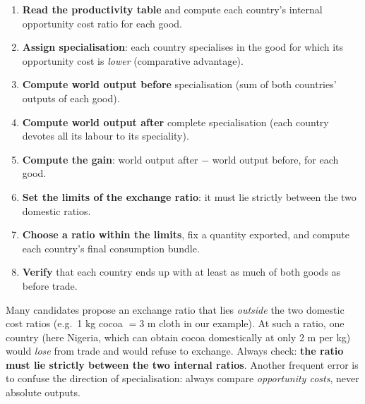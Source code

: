 \documentclass[11pt]{article}
\begin{document}
\begin{methode}
\begin{enumerate}
\item \textbf{Read the productivity table} and compute each country's internal opportunity cost ratio for each good.
\item \textbf{Assign specialisation}: each country specialises in the good for which its opportunity cost is \emph{lower} (comparative advantage).
\item \textbf{Compute world output before} specialisation (sum of both countries' outputs of each good).
\item \textbf{Compute world output after} complete specialisation (each country devotes all its labour to its speciality).
\item \textbf{Compute the gain}: world output after $-$ world output before, for each good.
\item \textbf{Set the limits of the exchange ratio}: it must lie strictly between the two domestic ratios.
\item \textbf{Choose a ratio within the limits}, fix a quantity exported, and compute each country's final consumption bundle.
\item \textbf{Verify} that each country ends up with at least as much of both goods as before trade.
\end{enumerate}
\end{methode}

\begin{attention}
Many candidates propose an exchange ratio that lies \emph{outside} the two domestic cost ratios (e.g.\ 1 kg cocoa $= 3$ m cloth in our example). At such a ratio, one country (here Nigeria, which can obtain cocoa domestically at only 2 m per kg) would \emph{lose} from trade and would refuse to exchange. Always check: \textbf{the ratio must lie strictly between the two internal ratios}. Another frequent error is to confuse the direction of specialisation: always compare \emph{opportunity costs}, never absolute outputs.
\end{attention}
\end{document}
